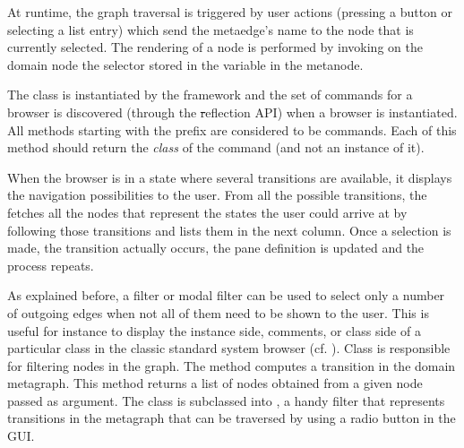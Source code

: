 \documentclass[a4paper,10pt,twoside]{book}
\begin{document}
At runtime, the graph traversal is triggered by user actions (\eg pressing a button or selecting a list entry) which send the metaedge's name to the node that is currently selected. The rendering of a node is performed by invoking on the domain node the selector stored in the variable  in the metanode.

The class  is instantiated by the framework and the set of commands for a browser is discovered (through the \st reflection API) when a browser is instantiated. All methods starting with the  prefix are considered to be commands. Each of this method should return the \emph{class} of the command (and not an instance of it).


When the browser is in a state where several transitions are available, it displays the navigation possibilities to the user. From all the possible transitions, the \obf fetches all the nodes that represent the states the user could arrive at by following those transitions and lists them in the next column. Once a selection is made, the transition  actually occurs, the pane definition is updated and the process repeats.

As explained before, a filter or modal filter can be used to select only a number of outgoing edges when not all of them need to be shown to the user. This is useful for instance to display the instance side, comments, or class side of a particular class in the classic standard system browser (cf. ). Class  is responsible for filtering nodes in the graph. The method  computes a transition in the domain metagraph. This method returns a list of nodes obtained from a given node passed as argument. The class  is subclassed into , a handy filter that represents transitions in the metagraph that can be traversed by using a radio button in the GUI.
\end{document}
